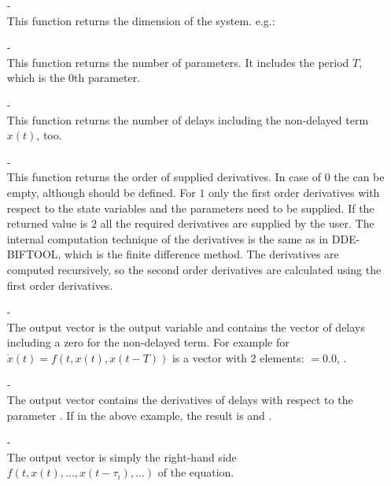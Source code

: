 \documentclass[10pt,a4paper]{ddedoc}
\begin{document}
\begin{itemize}
  \item[-]  \\ 
  This function returns the dimension of the
  system. e.g.: 
  
  \item[-]  \\ 
  This function returns the number of parameters. It
  includes the period $T$, which is the 0th parameter.
  
  \item[-]  \\ 
  This function returns the number of delays including the non-delayed term $x (
t )$, too.
  
  \item[-]  \\ 
  This function returns the order of supplied derivatives. In case of $0$ the
 can be empty, although should be defined. For $1$ only the
first order derivatives with respect to the state variables and the parameters
need to be supplied. If the returned value is $2$ all the required derivatives
are supplied by the user. The internal computation technique of the derivatives
is the same as in DDE-BIFTOOL, which is the finite difference method. The
derivatives are computed recursively, so the second order derivatives are
calculated using the first order derivatives.
  
  \item[-] 
\\
  The output vector  is the output variable and contains the vector of delays
  including a zero for the non-delayed term. For example for $\dot{x} ( t ) =
  f ( t, x ( t ), x ( t - T ) )$  is a vector with 2 elements:
  $=0.0$, .
  
  \item[-]  \\
  The output vector  contains the derivatives of delays with respect to the parameter
  . If  in the above example, the result is
   and .
  
  \item[-]  \\ 
  The output vector  is simply the right-hand side $f ( t, x ( t ), \ldots, x ( t - \tau_i ),
\ldots )$ of the equation.
  

\end{itemize}
\end{document}
